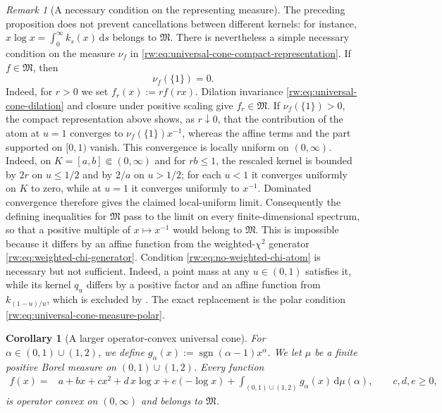 \documentclass[11pt]{article}
\newtheorem{corollary}[corollary]{Corollary}
\theoremstyle{remark}
\newtheorem{remark}[remark]{Remark}
\newcommand{\1}{\mathbbm{1}}
\begin{document}
\begin{remark}[A necessary condition on the representing measure]
The preceding proposition does not prevent cancellations between
different kernels: for instance,
$x\log x=\int_0^\infty k_s(x)\,\mathrm ds$ belongs to
$\mathfrak M$.  There is nevertheless a simple necessary condition
on the measure \(\nu_f\) in
\eqref{rw:eq:universal-cone-compact-representation}.
If $f\in\mathfrak M$, then
\begin{equation}
 \nu_f(\{1\})=0.
 \label{rw:eq:no-weighted-chi-atom}
\end{equation}
Indeed, for $r>0$ we set $f_r(x):=r f(rx)$.  Dilation invariance
\eqref{rw:eq:universal-cone-dilation} and closure under positive
scaling give $f_r\in\mathfrak M$.  If $\nu_f(\{1\})>0$, the compact
representation above shows, as $r\downarrow0$, that the contribution
of the atom at $u=1$ converges to $\nu_f(\{1\})x^{-1}$, whereas the
affine terms and the part supported on $[0,1)$ vanish.  This
convergence is locally uniform on $(0,\infty)$.  Indeed, on
$K=[a,b]\Subset(0,\infty)$ and for $rb\leq1$, the rescaled kernel is
bounded by $2r$ on $u\leq1/2$ and by $2/a$ on $u>1/2$; for each
$u<1$ it converges uniformly on $K$ to zero, while at $u=1$ it
converges uniformly to $x^{-1}$.  Dominated convergence therefore
gives the claimed local-uniform limit.
Consequently the defining inequalities for $\mathfrak M$ pass to the
limit on every finite-dimensional spectrum, so that a positive
multiple of $x\mapsto x^{-1}$ would belong to $\mathfrak M$.  This is
impossible because it differs by an affine function from the
weighted-$\chi^2$ generator
\eqref{rw:eq:weighted-chi-generator}.  Condition
\eqref{rw:eq:no-weighted-chi-atom} is necessary but not sufficient.
Indeed, a point mass at any \(u\in(0,1)\) satisfies it, while its
kernel \(q_u\) differs by a positive factor and an affine function
from \(k_{(1-u)/u}\), which is excluded by
.  The exact replacement is the
polar condition
\eqref{rw:eq:universal-cone-measure-polar}.
\end{remark}

\begin{corollary}[A larger operator-convex universal cone]
\label{rw:cor:larger-monotone-cone}
For $\alpha\in(0,1)\cup(1,2)$, we define
$g_\alpha(x):=\operatorname{sgn}(\alpha-1)x^\alpha$.  We let $\mu$
be a finite positive Borel measure on
$(0,1)\cup(1,2)$.  Every function
\begin{equation}
 \begin{split}
 f(x)={}&a+bx+cx^2+d\,x\log x+e(-\log x)+\int_{(0,1)\cup(1,2)}g_\alpha(x)\,\mathrm d\mu(\alpha),
 \qquad c,d,e\geq0,
 \end{split}
 \label{rw:eq:larger-monotone-cone}
\end{equation}
is operator convex on $(0,\infty)$ and belongs to $\mathfrak M$.
\end{corollary}
\end{document}
